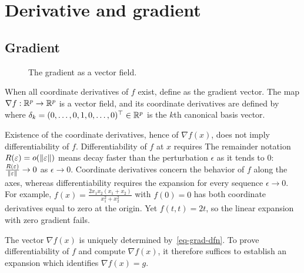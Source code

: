 \section{Derivative and gradient}

\subsection{Gradient}


\begin{figure}[tbp]
\centering
{}
\caption{The gradient as a vector field.}
\label{fig-review-smooth-gradient-field}
\end{figure}
When all coordinate derivatives of $f$ exist, define
as the gradient vector. The map $\nabla f : \mathbb{R}^p \rightarrow \mathbb{R}^p$ is a vector field, and its coordinate derivatives are defined by
where $\delta_k=(0,\ldots,0,1,0,\ldots,0)^\top \in \mathbb{R}^p$ is the $k$th canonical basis vector.

Existence of the coordinate derivatives, hence of $\nabla f(x)$, does not imply differentiability of $f$. Differentiability of $f$ at $x$ requires
%
The remainder notation $R(\varepsilon) = o(\lVert\varepsilon\rVert)$ means decay faster than the perturbation $\epsilon$ as it tends to $0$: $\frac{R(\varepsilon)}{\lVert\varepsilon\rVert} \rightarrow 0$ as $\epsilon \rightarrow 0$. Coordinate derivatives concern the behavior of $f$ along the axes, whereas differentiability requires the expansion for every sequence $\epsilon\rightarrow 0$.
%
For example, $f(x)=\frac{2 x_1 x_2 (x_1+x_2)}{x_1^2+x_2^2}$ with $f(0)=0$ has both coordinate derivatives equal to zero at the origin. Yet $f(t,t)=2t$, so the linear expansion with zero gradient fails.

The vector $\nabla f(x)$ is uniquely determined by~\eqref{eq-grad-dfn}. To prove differentiability of $f$ and compute $\nabla f(x)$, it therefore suffices to establish an expansion
which identifies $\nabla f(x)=g$.

